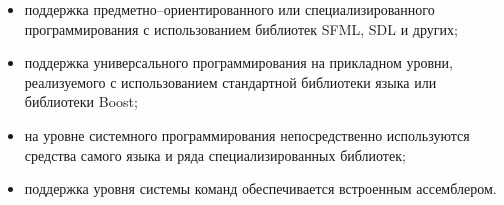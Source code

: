 \begin{itemize}
    \item поддержка предметно--ориентированного или специализированного программирования с использованием библиотек SFML, SDL и других;
    \item поддержка универсального программирования на прикладном уровни, реализуемого с использованием стандартной библиотеки языка или библиотеки Boost;
    \item на уровне системного программирования непосредственно используются средства самого языка и ряда специализированных библиотек;
    \item поддержка уровня системы команд обеспечивается встроенным ассемблером.
\end{itemize}

